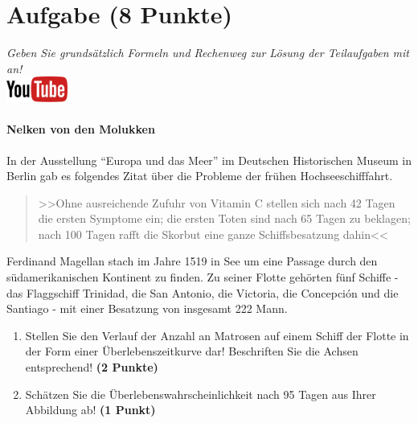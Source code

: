 \documentclass[a4paper, 9pt]{scrartcl}\usepackage[]{graphicx}\usepackage[]{xcolor}
\begin{document}
 
\clearpage

\section{Aufgabe \hfill (8 Punkte)}

\textit{Geben Sie grunds{\"a}tzlich Formeln und Rechenweg zur L{\"o}sung der
  Teilaufgaben mit an!} \\[1Ex]

\hfill\href{https://youtu.be/1B53cVFIU7Q}{\includegraphics[width =
  2cm]{img/youtube}} %
\hspace{2Ex}

\paragraph{Nelken von den Molukken}



In der Ausstellung "`Europa und das Meer"' im Deutschen Historischen Museum in
Berlin gab es folgendes Zitat {\"u}ber die Probleme der fr{\"u}hen Hochseeschifffahrt.

\begin{quote}
  >>Ohne ausreichende Zufuhr von Vitamin C stellen sich nach 42 Tagen die
  ersten Symptome ein; die ersten Toten sind nach 65 Tagen zu beklagen;
  nach 100 Tagen rafft die Skorbut eine ganze Schiffsbesatzung dahin<<
\end{quote}

Ferdinand Magellan stach im Jahre 1519 in See um eine Passage durch den
s{\"u}damerikanischen Kontinent zu finden. Zu seiner Flotte geh{\"o}rten
f{\"u}nf Schiffe - das Flaggschiff Trinidad, die San Antonio, die Victoria, die
Concepci{\'o}n und die Santiago - mit einer Besatzung von insgesamt
222 Mann. 

\begin{enumerate}
\item Stellen Sie den Verlauf der Anzahl an Matrosen auf einem Schiff der
  Flotte in der Form einer {\"U}berlebenszeitkurve dar! Beschriften Sie die
  Achsen entsprechend! \textbf{(2 Punkte)} 
\item Sch{\"a}tzen Sie die {\"U}berlebenswahrscheinlichkeit nach 95 Tagen
  aus Ihrer Abbildung ab! \textbf{(1 Punkt)} 
\end{enumerate}
\end{document}
